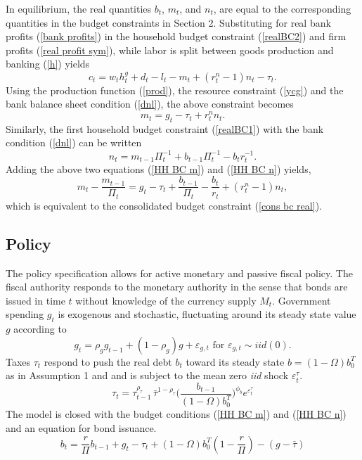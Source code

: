 \documentclass[]{article}
\begin{document}
In equilibrium, the real quantities $b_{t}$, $m_{t}$, and $n_{t}$, are equal to the corresponding quantities in the budget constraints in Section 2. Substituting for real bank profits (\ref{bank profits}) in the household budget constraint (\ref{realBC2}) and firm profits (\ref{real profit sym}), while labor is split between goods production and banking (\ref{h}) yields
\[c_{t}=w_{t}h_{t}^{g}+d_{t}-l_{t}-m_{t}+\left(
r_{t}^{n}-1\right) n_{t}-\tau_{t}.\]
Using the production function (\ref{prod}), the resource constraint (\ref{ycg}) and the bank balance sheet condition (\ref{dnl}), the above constraint becomes
\begin{equation}
    m_{t}=g_{t}-\tau_{t}+r^{n}_{t}n_{t}.
    \label{HH BC m}
\end{equation}
Similarly, the first household budget constraint (\ref{realBC1}) with the bank condition (\ref{dnl}) can be written
\begin{equation}
    n_{t}=m_{t-1}\Pi_{t}^{-1}+b_{t-1}\Pi_{t}^{-1}-b_{t}r_{t}^{-1}.
    \label{HH BC n}
\end{equation}
Adding the above two equations (\ref{HH BC m}) and (\ref{HH BC n}) yields,
\begin{equation} \label{policy BC}
m_{t}-\frac{m_{t-1}}{\Pi_{t}}=g_{t}-\tau_{t}+\frac{b_{t-1}}{\Pi_t}-\frac{b_{t}}{r_{t}}+\left(r_{t}^{n}-1\right) n_{t},
\end{equation}
which is equivalent to the consolidated budget constraint (\ref{cons bc real}).

\subsection{Policy}

The policy specification allows for active monetary and passive fiscal policy. The fiscal authority responds to the monetary authority in the sense that bonds are issued in time $t$ without knowledge of the currency supply $M_{t}$. Government spending $g_{t}$ is exogenous and stochastic, fluctuating around its steady state value $g$ according to
\begin{equation}
g_{t}=\rho_{g}g_{t-1}+(1-\rho_{g})g+\varepsilon_{g,t} \text{ for }\varepsilon_{g,t}\sim
iid\left( 0\right).
\label{g}
\end{equation}%
Taxes $\tau_{t}$ respond to push the real debt $b_{t}$ toward its steady state $b=(1-\Omega)b_{0}^{T}$ as in Assumption 1 and \textcite{eusepi2018fiscal} and is subject to the mean zero \textit{iid} shock $\varepsilon^\tau_t$. 
\begin{equation}
   \tau_t = \tau_{t-1}^{\rho_\tau}\,\bar\tau^{1-\rho_\tau}
\Big(\frac{b_{t-1}}{(1-\Omega)b_0^{T}}\Big)^{\phi_b} e^{\varepsilon^\tau_t}
    \label{tau}
\end{equation}
The model is closed with the budget conditions (\ref{HH BC m}) and (\ref{HH BC n}) and an equation for bond issuance.
\begin{equation}
    b_t = \frac{r}{\Pi}b_{t-1} + g_t - \tau_t + (1-\Omega)b_0^{T}\left(1-\frac{r}{\Pi}\right) - (g-\bar\tau)
    \label{b issue}
\end{equation}
\end{document}
